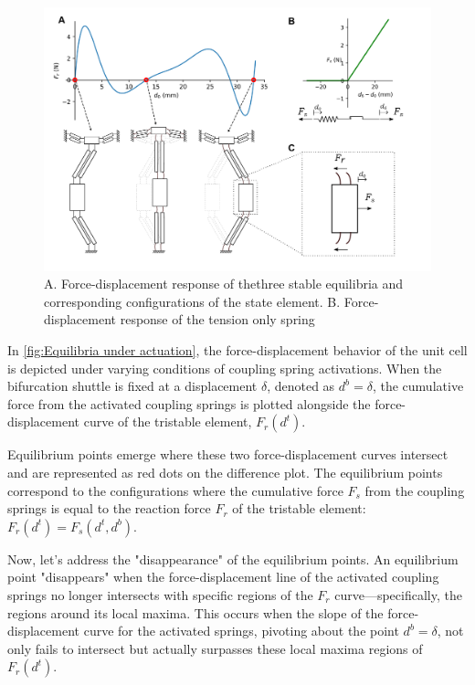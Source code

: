 \begin{figure}[h]
    \centering
    \includegraphics[width=\textwidth]{images/SVGs/Equilibria1.pdf}
    \caption{A. Force-displacement response of thethree stable equilibria and corresponding configurations of the state element. B. Force-displacement response of the tension only spring }
    \label{fig:Equilibria and Tension-only spring}

\end{figure}



In \autoref*{fig:Equilibria under actuation}, the force-displacement behavior of the unit cell is depicted under varying conditions of coupling spring activations. When the bifurcation shuttle is fixed at a displacement \( \delta \), denoted as \( d^b = \delta \), the cumulative force from the activated coupling springs is plotted alongside the force-displacement curve of the tristable element, \( F_r(d^t) \).

Equilibrium points emerge where these two force-displacement curves intersect and are represented as red dots on the difference plot. The equilibrium points correspond to the configurations where the cumulative force \( F_s \) from the coupling springs is equal to the reaction force \( F_r \) of the tristable element: \( F_r(d^t) = F_s(d^t, d^b) \).

Now, let's address the "disappearance" of the equilibrium points. An equilibrium point "disappears" when the force-displacement line of the activated coupling springs no longer intersects with specific regions of the \( F_r \) curve—specifically, the regions around its local maxima. This occurs when the slope of the force-displacement curve for the activated springs, pivoting about the point \( d^b = \delta \), not only fails to intersect but actually surpasses these local maxima regions of \( F_r(d^t) \).

